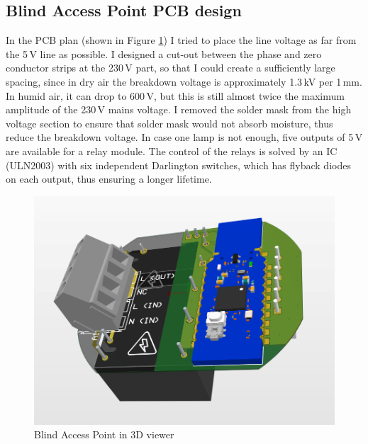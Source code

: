\subsection{Blind Access Point PCB design}
In the PCB plan (shown in Figure \ref{fig:bap3D}) I tried to place the line voltage as far from the 5\,\si{\volt} line as possible. I designed a cut-out between the phase and zero conductor strips at the 230\,\si{\volt} part, so that I could create a sufficiently large spacing, since in dry air the breakdown voltage is approximately 1.3\,\si{\kilo\volt} per 1\,\si{\milli\metre}. In humid air, it can drop to 600\,\si{\volt}\cite{airbreakdownvoltage}, but this is still almost twice the maximum amplitude of the 230\,\si{\volt} mains voltage. I removed the solder mask from the high voltage section to ensure that solder mask would not absorb moisture, thus reduce the breakdown voltage.
In case one lamp is not enough, five outputs of 5\,\si{\volt} are available for a relay module. The control of the relays is solved by an IC (ULN2003) with six independent Darlington switches, which has flyback diodes on each output, thus ensuring a longer lifetime.

\begin{figure}[!htb]
    \centering
    \includegraphics[width=\textwidth]{img/bap3d.png}
    \caption{Blind Access Point in 3D viewer}
    \label{fig:bap3D}
\end{figure}

